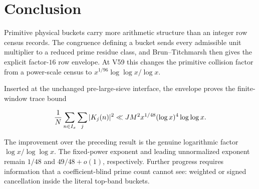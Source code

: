 \section{Conclusion}
\label{sec:conclusion}

Primitive physical buckets carry more arithmetic structure than an integer
row census records.  The congruence defining a bucket sends every admissible
unit multiplier to a reduced prime residue class, and Brun--Titchmarsh then
gives the explicit factor-$16$ row envelope.  At V59 this changes the
primitive collision factor from a power-scale census to
$x^{1/96}\log\log x/\log x$.

Inserted at the unchanged pre-large-sieve interface, the envelope proves the
finite-window trace bound

\[
 \frac1N\sum_{n\in I_x}\sum_j|K_j(n)|^2
 \ll JM^2x^{1/48}(\log x)^4\log\log x.
\]

The improvement over the preceding result is the genuine logarithmic factor
$\log x/\log\log x$.  The fixed-power exponent and leading unnormalized
exponent remain $1/48$ and $49/48+o(1)$, respectively.  Further progress
requires information that a coefficient-blind prime count cannot see: weighted
or signed cancellation inside the literal top-band buckets.
